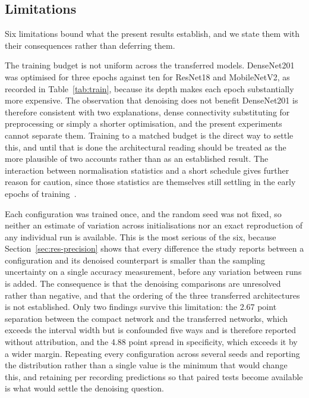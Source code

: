 \documentclass[pdflatex,sn-mathphys-num]{sn-jnl}
\begin{document}
\subsection{Limitations}\label{sec:res-limits}

Six limitations bound what the present results establish, and we state them
with their consequences rather than deferring them.

The training budget is not uniform across the transferred models. DenseNet201
was optimised for three epochs against ten for ResNet18 and MobileNetV2, as
recorded in Table~\ref{tab:train}, because its depth makes each epoch
substantially more expensive. The observation that denoising does not benefit
DenseNet201 is therefore consistent with two explanations, dense connectivity
substituting for preprocessing or simply a shorter optimisation, and the
present experiments cannot separate them. Training to a matched budget is the
direct way to settle this, and until that is done the architectural reading
should be treated as the more plausible of two accounts rather than as an
established result. The interaction between normalisation statistics and a
short schedule gives further reason for caution, since those statistics are
themselves still settling in the early epochs of
training~\cite{awais2021}.

Each configuration was trained once, and the random seed was not fixed, so
neither an estimate of variation across initialisations nor an exact
reproduction of any individual run is available. This is the most serious of
the six, because Section~\ref{sec:res-precision} shows that every difference
the study reports between a configuration and its denoised counterpart is
smaller than the sampling uncertainty on a single accuracy measurement, before
any variation between runs is added. The consequence is that the denoising
comparisons are unresolved rather than negative, and that the ordering of the
three transferred architectures is not established. Only two findings survive
this limitation: the 2.67 point separation between the compact network and the
transferred networks, which exceeds the interval width but is confounded five
ways and is therefore reported without attribution, and the 4.88 point spread
in specificity, which exceeds it by a wider margin. Repeating every
configuration across several seeds and reporting the distribution rather than
a single value is the minimum that would change this, and retaining per
recording predictions so that paired tests become available is what would
settle the denoising question.
\end{document}
